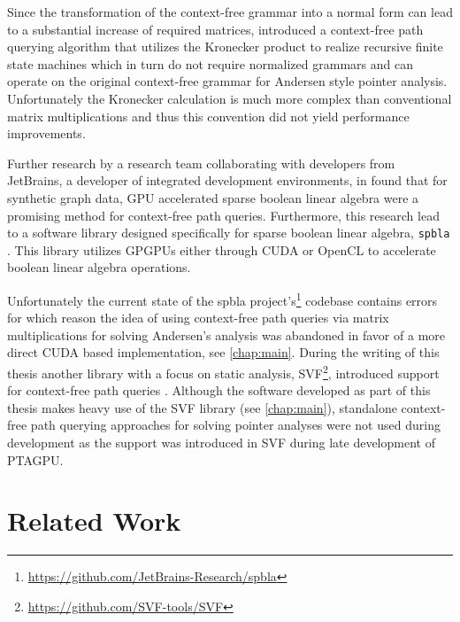Since the transformation of the context-free grammar into a normal form can lead to a substantial increase of required matrices, \cite{orachev2020context} introduced a context-free path querying algorithm that utilizes the Kronecker product to realize recursive finite state machines which in turn do not require normalized grammars and can operate on the original context-free grammar for Andersen style pointer analysis.
Unfortunately the Kronecker calculation is much more complex than conventional matrix multiplications and thus this convention did not yield performance improvements.

Further research by a research team collaborating with developers from JetBrains, a developer of integrated development environments, in \cite{mishin2019evaluation} found that for synthetic graph data, GPU accelerated sparse boolean linear algebra were a promising method for context-free path queries.
Furthermore, this research lead to a software library designed specifically for sparse boolean linear algebra, \verb|spbla| \cite{orachev2021spbla}. This library utilizes GPGPUs either through CUDA or OpenCL to accelerate boolean linear algebra operations.

Unfortunately the current state of the spbla project's\footnote{\url{https://github.com/JetBrains-Research/spbla}} codebase contains errors for which reason the idea of using context-free path queries via matrix multiplications for solving Andersen's analysis was abandoned in favor of a more direct CUDA based implementation, see \autoref{chap:main}.
During the writing of this thesis another library with a focus on static analysis, SVF\footnote{\url{https://github.com/SVF-tools/SVF}}, introduced support for context-free path queries \cite{lei2022taming}. Although the software developed as part of this thesis makes heavy use of the SVF library (see \autoref{chap:main}), standalone context-free path querying approaches for solving pointer analyses were not used during development as the support was introduced in SVF during late development of PTAGPU.
\section{Related Work}
